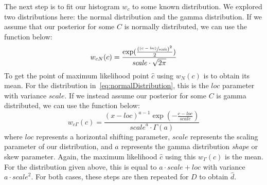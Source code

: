 The next step is to fit our histogram $w_c$ to some known distribution.
We explored two distributions here: the normal distribution and the gamma distribution.
If we assume that our posterior for some $C$ is normally distributed, we can use the function below:
\begin{equation}\label{eq:normalDistribution}
    w_{cN}(c) = \frac{\exp(\frac{\left( \sfrac{(c - \mathit{loc})}{\mathit{scale}} \right)^2}{2} )}
    {\mathit{scale} \cdot \sqrt{2\pi}}
\end{equation}
To get the point of maximum likelihood point $\hat{c}$ using $w_{N}(c)$ is to obtain its mean.
For the distribution in~\autoref{eq:normalDistribution}, this is the $\mathit{loc}$ parameter with variance
$\mathit{scale}$.
If we instead assume our posterior for some $C$ is gamma distributed, we can use the function below:
\begin{equation}
    w_{c\Gamma}(c) = \frac{(x-\mathit{loc})^{a-1}\exp(-\frac{c-\mathit{loc}}{\mathit{scale}})}{\mathit{scale}^a
    \cdot \Gamma(a)}
\end{equation}
where $\mathit{loc}$ represents a horizontal shifting parameter, $\mathit{scale}$ represents the scaling parameter of
our distribution, and $a$ represents the gamma distribution \emph{shape} or skew parameter.
Again, the maximum likelihood $\hat{c}$ using this $w_\Gamma(c)$ is the mean.
For the distribution given above, this is equal to $a \cdot \mathit{scale} + \mathit{loc}$ with variance
$a \cdot \mathit{scale}^2$.
For both cases, these steps are then repeated for $D$ to obtain $\hat{d}$.
